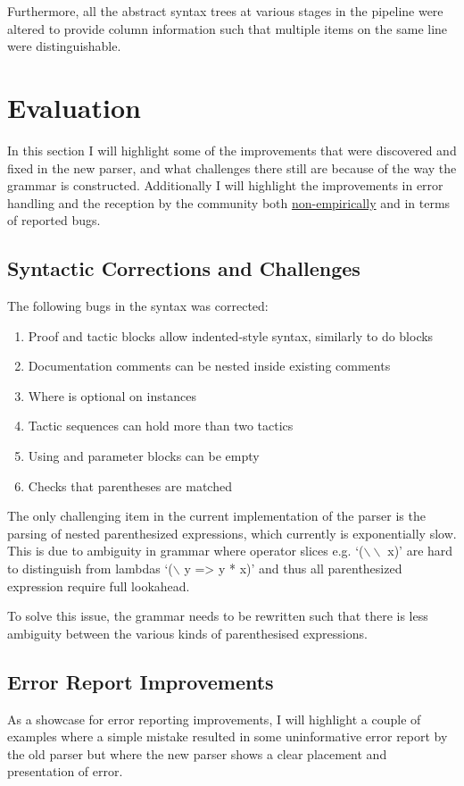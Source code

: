 \documentclass[a4paper]{article}%
\begin{document}
Furthermore, all the abstract syntax trees at various stages in the pipeline were altered to provide column information such that multiple items on the same line were distinguishable.

\section{Evaluation}
\label{sec:Evaluation}
In this section I will highlight some of the improvements that were discovered and fixed in the new parser, and what challenges there still are because of the way the grammar is constructed.
Additionally I will highlight the improvements in error handling and the reception by the community both \underline{non-empirically} and in terms of reported bugs.

\subsection{Syntactic Corrections and Challenges}
\label{sub:SyntacticCorrectionsandChallenges}
The following bugs in the syntax was corrected:
\begin{enumerate}
  \item Proof and tactic blocks allow indented-style syntax, similarly to do blocks
  \item Documentation comments can be nested inside existing comments
  \item Where is optional on instances
  \item Tactic sequences can hold more than two tactics
  \item Using and parameter blocks can be empty
  \item Checks that parentheses are matched
\end{enumerate}

The only challenging item in the current implementation of the parser is the parsing of nested parenthesized expressions, which currently is exponentially slow.
This is due to ambiguity in grammar where operator slices e.g. `($\backslash\backslash$ x)' are hard to distinguish from lambdas `($\backslash$ y => y * x)' and thus all parenthesized expression require full lookahead.

To solve this issue, the grammar needs to be rewritten such that there is less ambiguity between the various kinds of parenthesised expressions.

\subsection{Error Report Improvements}
\label{sub:ErrorReportImprovements}
As a showcase for error reporting improvements, I will highlight a couple of examples where a simple mistake resulted in some uninformative error report by the old parser
but where the new parser shows a clear placement and presentation of error.
\end{document}
